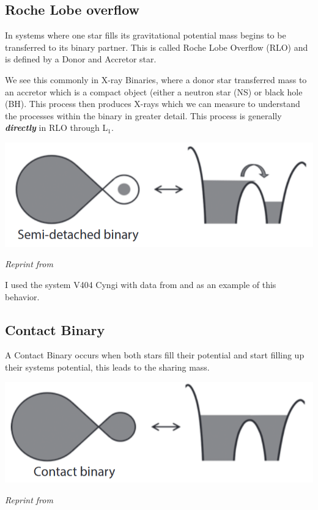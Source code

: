 \documentclass[12pt, letterpaper]{article}
\begin{document}
        \subsection{\centering Roche Lobe overflow} %
        In systems where one star fills its gravitational potential mass begins to be transferred to its binary partner. This is called Roche Lobe Overflow (RLO) and is defined by a Donor and Accretor star. 

        We see this commonly in X-ray Binaries, where a donor star transferred mass to an accretor which is a compact object (either a neutron star (NS) or black hole (BH). This process then produces X-rays which we can measure to understand the processes within the binary in greater detail. This process is generally \textbf{\textit{directly}} in RLO through L$_1$. 
        
       \begin{center}
            \includegraphics[scale = .4]{Figs/Semi-detached binary.png}

            \textit{Reprint from \cite{TaurisvandenHeuvel+2023}}
        \end{center}
        
        I used the system V404 Cyngi with data from \cite{Bernardini_2016} and \cite{10.1093/mnras/271.1.L10} as an example of this behavior. 

        \subsection{\centering Contact Binary}
        A Contact Binary occurs when both stars fill their potential and start filling up their systems potential, this leads to the sharing mass.
        
        \begin{center}
        \includegraphics[scale = .4]{Figs/Conact Binary.png}

        \textit{Reprint from \cite{TaurisvandenHeuvel+2023}}
        \end{center}
        
\end{document}
